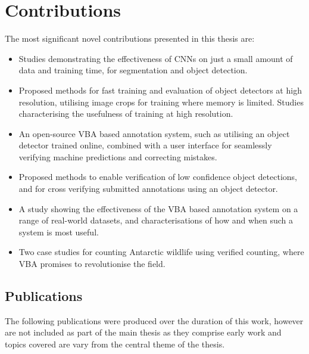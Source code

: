 \section {Contributions}
\label{sec: contributions}

The most significant novel contributions presented in this thesis are:

\begin{itemize}
    
    \item Studies demonstrating the effectiveness of \gls{CNN}s on just a small amount of data and training time, for segmentation and object detection.
    
    \item Proposed methods for fast training and evaluation of object detectors at high resolution, utilising image crops for training where memory is limited. Studies characterising the usefulness of training at high resolution.
    
    \item An open-source \gls{VBA} based annotation system, such as utilising an object detector trained online, combined with a user interface for seamlessly verifying machine predictions and correcting mistakes.
    
    \item Proposed methods to enable verification of low confidence object detections, and for cross verifying submitted annotations using an object detector.
    
    \item A study showing the effectiveness of the \gls{VBA} based annotation system on a range of real-world datasets, and characterisations of how and when such a system is most useful.
    
    \item Two case studies for counting Antarctic wildlife using verified counting, where \gls{VBA} promises to revolutionise the field. 
    
\end{itemize}

\subsection {Publications}
\label{sec: publications}

The following publications were produced over the duration of this work, however are not included as part of the main thesis as they comprise early work and topics covered are vary from the central theme of the thesis. 

